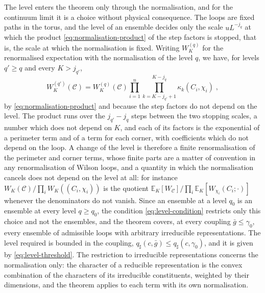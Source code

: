 \documentclass[11pt]{preprint}
\numberwithin{equation}{section}
\theoremstyle{definition}
\theoremstyle{remark}
\theoremstyle{plain}
\begin{document}
The level enters the theorem only through the normalisation, and for the continuum limit it is a choice without physical consequence. The loops are fixed paths in the torus, and the level of an ensemble decides only the scale $uL^{-j_q}$ at which the product \eqref{eq:normalisation-product} of the step factors is stopped, that is, the scale at which the normalisation is fixed. Writing $W^{(q)}_K$ for the renormalised expectation with the normalisation of the level $q$, we have, for levels $q' \geq q$ and every $K > j_{q'}$,
\begin{equation}\label{eq:level-change}
    W^{(q')}_K(\mathcal C) = W^{(q)}_K(\mathcal C)\prod_{i=1}^{n}\prod_{k=K-j_{q'}+1}^{K-j_q}\kappa_k(C_i, \chi_i)\;,
\end{equation}
by \eqref{eq:normalisation-product} and because the step factors do not depend on the level. The product runs over the $j_{q'} - j_q$ steps between the two stopping scales, a number which does not depend on $K$, and each of its factors is the exponential of a perimeter term and of a term for each corner, with coefficients which do not depend on the loop. A change of the level is therefore a finite renormalisation of the perimeter and corner terms, whose finite parts are a matter of convention in any renormalisation of Wilson loops, and a quantity in which the normalisation cancels does not depend on the level at all: for instance $W_K(\mathcal C)/\prod_iW_K((C_i, \chi_i))$ is the quotient $\mathbb E_K[W_{\mathcal C}]/\prod_i\mathbb E_K[W_{\chi_i}(C_i; \cdot)]$ whenever the denominators do not vanish. Since an ensemble at a level $q_0$ is an ensemble at every level $q \geq q_0$, the condition \eqref{eq:level-condition} restricts only this choice and not the ensembles, and the theorem covers, at every coupling $\bar g \leq \gamma_0$, every ensemble of admissible loops with arbitrary irreducible representations. The level required is bounded in the coupling, $q_\sharp(c, \bar g) \leq q_\sharp(c, \gamma_0)$, and it is given by \eqref{eq:level-threshold}. The restriction to irreducible representations concerns the normalisation only: the character of a reducible representation is the convex combination of the characters of its irreducible constituents, weighted by their dimensions, and the theorem applies to each term with its own normalisation.
\end{document}
